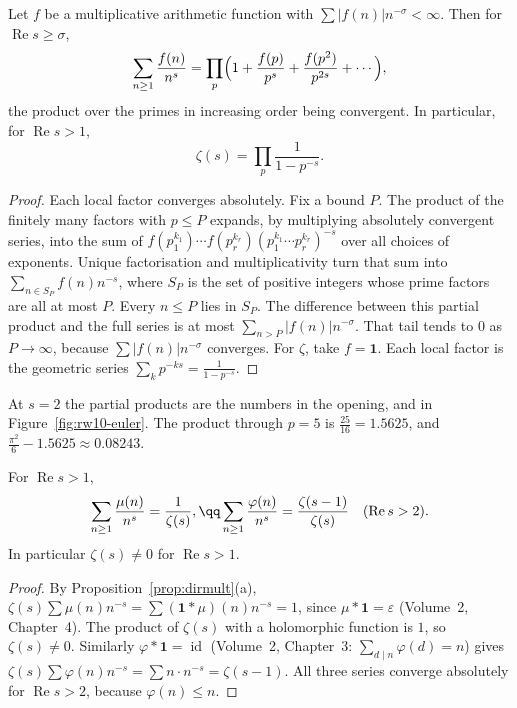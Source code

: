 \begin{theorem}\label{thm:eulerproduct}
Let $f$ be a multiplicative arithmetic function with $\sum|f(n)|n^{-\sigma}<\infty$. Then for $\operatorname{Re}s\ge\sigma$,
\[
\sum_{n\ge1}\frac{f(n)}{n^s}=\prod_p\Bigl(1+\frac{f(p)}{p^s}+\frac{f(p^2)}{p^{2s}}+\cdots\Bigr),
\]
the product over the primes in increasing order being convergent. In particular, for $\operatorname{Re}s>1$,
\[
\zeta(s)=\prod_p\frac1{1-p^{-s}}.
\]
\end{theorem}
\begin{proof}
Each local factor converges absolutely. Fix a bound $P$. The product of the finitely many factors with $p\le P$ expands, by multiplying absolutely convergent series, into the sum of $f(p_1^{k_1})\cdots f(p_r^{k_r})(p_1^{k_1}\cdots p_r^{k_r})^{-s}$ over all choices of exponents. Unique factorisation and multiplicativity turn that sum into $\sum_{n\in S_P}f(n)n^{-s}$, where $S_P$ is the set of positive integers whose prime factors are all at most $P$. Every $n\le P$ lies in $S_P$. The difference between this partial product and the full series is at most $\sum_{n>P}|f(n)|n^{-\sigma}$. That tail tends to $0$ as $P\to\infty$, because $\sum|f(n)|n^{-\sigma}$ converges. For $\zeta$, take $f=\mathbf 1$. Each local factor is the geometric series $\sum_kp^{-ks}=\frac1{1-p^{-s}}$.
\end{proof}

At $s=2$ the partial products are the numbers in the opening, and in Figure~\ref{fig:rw10-euler}. The product through $p=5$ is $\frac{25}{16}=1.5625$, and $\frac{\pi^2}6-1.5625\approx0.08243$.

\begin{corollary}\label{cor:mobius}
For $\operatorname{Re}s>1$,
\[
\begin{gathered}\sum_{n\ge1}\frac{\mu(n)}{n^s}=\frac1{\zeta(s)},\qq\sum_{n\ge1}\frac{\varphi(n)}{n^s}=\frac{\zeta(s-1)}{\zeta(s)}\quad(\operatorname{Re}s>2).\end{gathered}
\]
In particular $\zeta(s)\ne0$ for $\operatorname{Re}s>1$.
\end{corollary}
\begin{proof}
By Proposition~\ref{prop:dirmult}(a), $\zeta(s)\sum\mu(n)n^{-s}=\sum(\mathbf 1*\mu)(n)n^{-s}=1$, since $\mu*\mathbf 1=\varepsilon$ (Volume~2, Chapter~4). The product of $\zeta(s)$ with a holomorphic function is $1$, so $\zeta(s)\ne0$. Similarly $\varphi*\mathbf 1=\operatorname{id}$ (Volume~2, Chapter~3: $\sum_{d\mid n}\varphi(d)=n$) gives $\zeta(s)\sum\varphi(n)n^{-s}=\sum n\cdot n^{-s}=\zeta(s-1)$. All three series converge absolutely for $\operatorname{Re}s>2$, because $\varphi(n)\le n$.
\end{proof}

